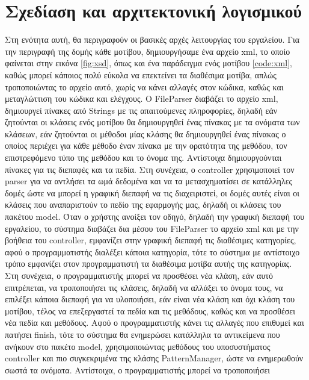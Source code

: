 \chapter{Σχεδίαση και αρχιτεκτονική λογισμικού}
\label{ch:architecture}
Στη ενότητα αυτή, θα περιγραφούν οι βασικές αρχές λειτουργίας του εργαλείου. Για την περιγραφή της δομής κάθε μοτίβου, 
δημιουργήσαμε ένα αρχείο xml, το οποίο φαίνεται στην εικόνα \ref{fig:xsd}, όπως και ένα παράδειγμα ενός μοτίβου \ref{code:xml}, καθώς μπορεί κάποιος πολύ εύκολα να επεκτείνει 
τα διαθέσιμα μοτίβα, απλώς τροποποιώντας το αρχείο αυτό, χωρίς να κάνει αλλαγές στον κώδικα, καθώς και μεταγλώττιση του κώδικα και ελέγχους. 
Ο FileParser διαβάζει το αρχείο xml, δημιουργεί πίνακες από Strings με τις απαιτούμενες πληροφορίες,  
δηλαδή εάν ζητούνται οι κλάσεις ενός μοτίβου θα δημιουργηθεί ένας πίνακας με τα ονόματα των κλάσεων, 
εάν ζητούνται οι μέθοδοι μίας κλάσης θα δημιουργηθεί ένας πίνακας ο οποίος περιέχει για κάθε μέθοδο έναν 
πίνακα με την ορατότητα της μεθόδου, τον επιστρεφόμενο τύπο της μεθόδου και το όνομα της. Αντίστοιχα δημιουργούνται πίνακες 
για τις διεπαφές και τα πεδία. Στη συνέχεια, ο controller χρησιμοποιεί τον parser για να αντλήσει τα ωμά δεδομένα 
και να τα μετασχηματίσει σε κατάλληλες δομές ώστε να μπορεί η γραφική διεπαφή να τις διαχειριστεί, οι δομές αυτές είναι 
οι κλάσεις που αναπαριστούν το πεδίο της εφαρμογής μας, δηλαδή οι κλάσεις του πακέτου model. \newline \newline
Όταν ο χρήστης ανοίξει τον οδηγό, δηλαδή την γραφική διεπαφή του εργαλείου, το σύστημα διαβάζει δια μέσου του FileParser το αρχείο xml 
και με την βοήθεια του controller, εμφανίζει στην γραφική διεπαφή τις διαθέσιμες κατηγορίες, αφού ο προγραμματιστής διαλέξει κάποια κατηγορία, 
τότε το σύστημα με αντίστοιχο τρόπο εμφανίζει στον προγραμματιστή τα διαθέσιμα μοτίβα αυτής της κατηγορίας. Στη συνέχεια, 
ο προγραμματιστής μπορεί να προσθέσει νέα κλάση, εάν αυτό επιτρέπεται, να τροποποιήσει τις κλάσεις, δηλαδή να αλλάξει το όνομα τους, 
να επιλέξει κάποια διεπαφή για να υλοποιήσει, εάν είναι νέα κλάση και όχι κλάση του μοτίβου, 
τέλος να επεξεργαστεί τα πεδία και τις μεθόδους, καθώς και να προσθέσει νέα πεδία και μεθόδους. Αφού ο προγραμματιστής κάνει τις αλλαγές που επιθυμεί και πατήσει
finish, τότε το σύστημα θα ενημερώσει κατάλληλα τα αντικείμενα που ανήκουν στο πακέτο model, χρησιμοποιώντας μεθόδους του υποσυστήματος controller και 
πιο συγκεκριμένα της κλάσης PatternManager, ώστε να ενημερωθούν σωστά τα ονόματα. Αντίστοιχα, ο προγραμματιστής μπορεί να τροποποιήσει 
